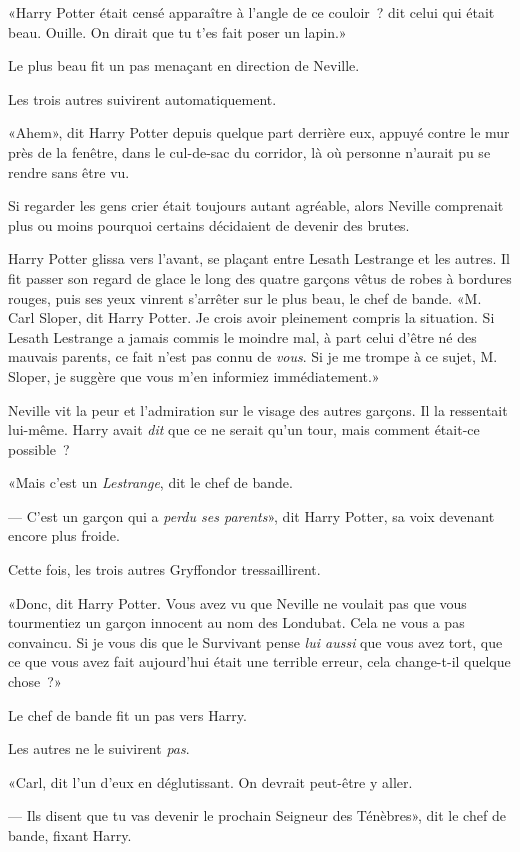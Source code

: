 «Harry Potter était censé apparaître à l'angle de ce couloir~? dit celui qui était beau. Ouille. On dirait que tu t'es fait poser un lapin.»

Le plus beau fit un pas menaçant en direction de Neville.

Les trois autres suivirent automatiquement.

«Ahem», dit Harry Potter depuis quelque part derrière eux, appuyé contre le mur près de la fenêtre, dans le cul-de-sac du corridor, là où personne n'aurait pu se rendre sans être vu.

Si regarder les gens crier était toujours autant agréable, alors Neville comprenait plus ou moins pourquoi certains décidaient de devenir des brutes.

Harry Potter glissa vers l'avant, se plaçant entre Lesath Lestrange et les autres. Il fit passer son regard de glace le long des quatre garçons vêtus de robes à bordures rouges, puis ses yeux vinrent s'arrêter sur le plus beau, le chef de bande. «M. Carl Sloper, dit Harry Potter. Je crois avoir pleinement compris la situation. Si Lesath Lestrange a jamais commis le moindre mal, à part celui d'être né des mauvais parents, ce fait n'est pas connu de \emph{vous}. Si je me trompe à ce sujet, M. Sloper, je suggère que vous m'en informiez immédiatement.»

Neville vit la peur et l'admiration sur le visage des autres garçons. Il la ressentait lui-même. Harry avait \emph{dit} que ce ne serait qu'un tour, mais comment était-ce possible~?

«Mais c'est un \emph{Lestrange}, dit le chef de bande.

--- C'est un garçon qui a \emph{perdu ses parents}», dit Harry Potter, sa voix devenant encore plus froide.

Cette fois, les trois autres Gryffondor tressaillirent.

«Donc, dit Harry Potter. Vous avez vu que Neville ne voulait pas que vous tourmentiez un garçon innocent au nom des Londubat. Cela ne vous a pas convaincu. Si je vous dis que le Survivant pense \emph{lui aussi} que vous avez tort, que ce que vous avez fait aujourd'hui était une terrible erreur, cela change-t-il quelque chose~?»

Le chef de bande fit un pas vers Harry.

Les autres ne le suivirent \emph{pas}.

«Carl, dit l'un d'eux en déglutissant. On devrait peut-être y aller.

--- Ils disent que tu vas devenir le prochain Seigneur des Ténèbres», dit le chef de bande, fixant Harry.

